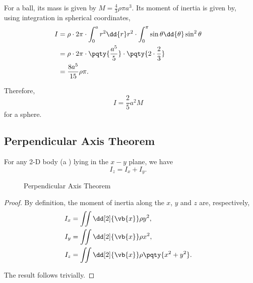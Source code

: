 \begin{example}
    \label{ex:moi-ball}%
    For a ball, its mass is given by \(M = \frac{4}{3} \rho \pi a^3\). Its moment of inertia is given by, using integration in spherical coordinates,
    \begin{subequations}\begin{align}
        I &= \rho \cdot 2\pi \cdot \int_{0}^{a} r^2 \dd{r} r^2 \cdot \int_{0}^{\pi} \sin \theta \dd{\theta} \sin^2 \theta \\
        &= \rho \cdot 2\pi \cdot \pqty{\frac{a^5}{5}} \cdot \pqty{2 \cdot \frac{2}{3}} \\
        &= \frac{8 a^5}{15} \rho \pi.
    \end{align}\end{subequations}

    Therefore,
    \begin{equation}
        \boxed{I = \frac{2}{5} a^2 M}
    \end{equation}
    for a sphere.
\end{example}

\subsection{Perpendicular Axis Theorem}

\begin{theorem}
    \label{thm:perpendicular-axis-thm}%
    For any 2-D body (a ) lying in the \(x-y\) plane, we have
    \begin{equation}
        \boxed{I_z = I_x + I_y.}
    \end{equation}
\end{theorem}

\begin{figure}[ht!]
    \centering

    \caption{Perpendicular Axis Theorem}
    \label{fig:perp-axis-thm}
\end{figure}

\begin{proof}
    By definition, the moment of inertia along the \(x\), \(y\) and \(z\) are, respectively,
    \begin{subequations}\begin{align}
        I_x &= \iint \dd[2]{\vb{x}} \rho y^2, \\
        I_y &= \iint \dd[2]{\vb{x}} \rho x^2, \\
        I_z &= \iint \dd[2]{\vb{x}} \rho \pqty{x^2 + y^2}.
    \end{align}\end{subequations}

    The result follows trivially.
\end{proof}

